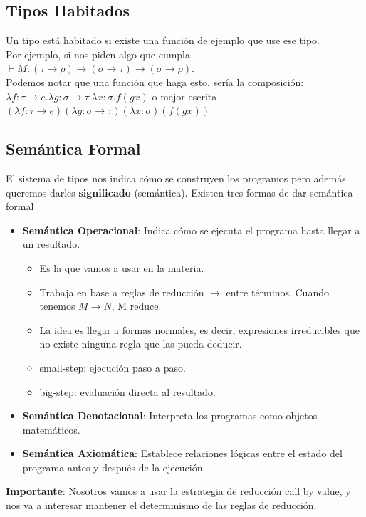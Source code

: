 \documentclass[10pt,a4paper]{article}
\begin{document}
\subsection{Tipos Habitados}
Un tipo está habitado si existe una función de ejemplo que use ese tipo. \\
Por ejemplo, si nos piden algo que cumpla $\vdash M:(\tau \rightarrow \rho) \rightarrow (\sigma \rightarrow \tau) \rightarrow (\sigma \rightarrow \rho)$. \\
Podemos notar que una función que haga esto, sería la composición: $\lambda f:\tau \rightarrow e . \lambda g :\sigma \rightarrow \tau . \lambda x:\sigma . f (gx)$ o mejor escrita $(\lambda f:\tau \rightarrow e) (\lambda g :\sigma \rightarrow \tau)(\lambda x:\sigma) (f (gx))$
\subsection{Semántica Formal}
El sistema de tipos nos indica cómo se construyen los programos pero además queremos darles \textbf{significado} (semántica).
Existen tres formas de dar semántica formal 
\begin{itemize}
    \item \textbf{Semántica Operacional}: Indica cómo se ejecuta el programa hasta llegar a un resultado.
    \begin{itemize}
        \item Es la que vamos a usar en la materia.
        \item Trabaja en base a reglas de reducción $\rightarrow$ entre términos. Cuando tenemos $M\rightarrow N$, M reduce. 
        \item La idea es llegar a formas normales, es decir, expresiones irreducibles que no existe ninguna regla que las pueda deducir.
        \item small-step: ejecución paso a paso.
        \item big-step: evaluación directa al resultado.
    \end{itemize}
    \item \textbf{Semántica Denotacional}:  Interpreta los programas como objetos matemáticos.
    \item \textbf{Semántica Axiomática}: Establece relaciones lógicas entre el estado del programa antes y después de la ejecución.
\end{itemize}
\textbf{Importante}: Nosotros vamos a usar la estrategia de reducción call by value, y nos va a interesar mantener el determinismo de las reglas de reducción.
\end{document}
